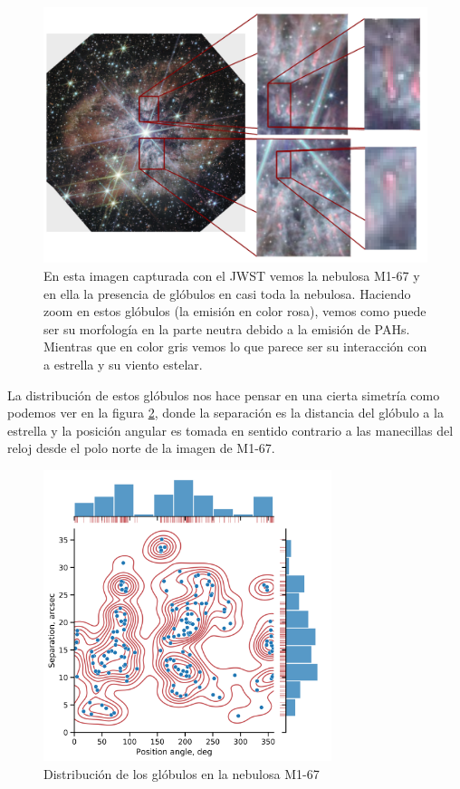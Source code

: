 \documentclass{book}
\begin{document}
\begin{figure}[htb]
    \centering
    \includegraphics[width=\textwidth]{Nuevas imagenes finales/Globulos_JWS_1.pdf}
    \caption{En esta imagen capturada con el JWST vemos la nebulosa M1-67 y en ella la presencia de glóbulos en casi toda la nebulosa. Haciendo zoom en estos glóbulos (la emisión en color rosa), vemos como puede ser su morfología en la parte neutra debido a la emisión de PAHs. Mientras que en color gris vemos lo que parece ser su interacción con a estrella y su viento estelar.}
    \label{fig:nudos WR124}
\end{figure}

La distribución de estos glóbulos nos hace pensar en una cierta simetría como podemos ver en la figura \ref{fig:dis_nudos}, donde la separación es la distancia del glóbulo a la estrella y la posición angular es tomada en sentido contrario a las manecillas del reloj desde el polo norte de la imagen de M1-67.

\begin{figure}[htb]
    \centering    \includegraphics[width=0.75\textwidth]{images Chapter 2/C2_nudos_distribucion.png}
    \caption{Distribución de los glóbulos en la nebulosa M1-67}
    \label{fig:dis_nudos}
\end{figure}
\end{document}
